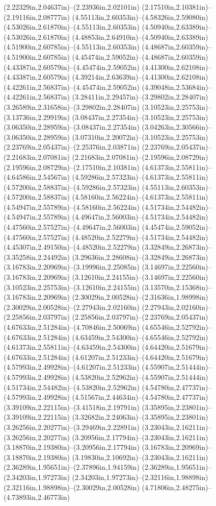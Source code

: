 (2.22329in,2.04637in)--(2.23936in,2.02101in) (2.17510in,2.10381in)--(2.19116in,2.08777in) (4.55113in,2.60353in)--(4.58326in,2.59080in) (4.53026in,2.61870in)--(4.55113in,2.60353in) (4.50940in,2.63389in)--(4.53026in,2.61870in) (4.48853in,2.64910in)--(4.50940in,2.63389in) (4.51900in,2.60785in)--(4.55113in,2.60353in) (4.48687in,2.60359in)--(4.51900in,2.60785in) (4.45474in,2.59052in)--(4.48687in,2.60359in) (4.43387in,2.60579in)--(4.45474in,2.59052in) (4.41300in,2.62108in)--(4.43387in,2.60579in) (4.39214in,2.63639in)--(4.41300in,2.62108in) (4.42261in,2.56837in)--(4.45474in,2.59052in) (4.39048in,2.53684in)--(4.42261in,2.56837in) (3.28411in,2.29457in)--(3.29802in,2.28407in) (3.26589in,2.31658in)--(3.29802in,2.28407in) (3.10523in,2.25753in)--(3.13736in,2.29919in) (3.08437in,2.27354in)--(3.10523in,2.25753in) (3.06350in,2.28959in)--(3.08437in,2.27354in) (3.04263in,2.30566in)--(3.06350in,2.28959in) (3.07310in,2.20072in)--(3.10523in,2.25753in) (2.23769in,2.05437in)--(2.25376in,2.03871in) (2.23769in,2.05437in)--(2.21683in,2.07081in) (2.21683in,2.07081in)--(2.19596in,2.08729in) (2.19596in,2.08729in)--(2.17510in,2.10381in) (4.61373in,2.55811in)--(4.64586in,2.54567in) (4.59286in,2.57323in)--(4.61373in,2.55811in) (4.57200in,2.58837in)--(4.59286in,2.57323in) (4.55113in,2.60353in)--(4.57200in,2.58837in) (4.58160in,2.56224in)--(4.61373in,2.55811in) (4.54947in,2.55789in)--(4.58160in,2.56224in) (4.51734in,2.54482in)--(4.54947in,2.55789in) (4.49647in,2.56003in)--(4.51734in,2.54482in) (4.47560in,2.57527in)--(4.49647in,2.56003in) (4.45474in,2.59052in)--(4.47560in,2.57527in) (4.48520in,2.52279in)--(4.51734in,2.54482in) (4.45307in,2.49150in)--(4.48520in,2.52279in) (3.32849in,2.26873in)--(3.35258in,2.24492in) (3.29636in,2.28608in)--(3.32849in,2.26873in) (3.16783in,2.20969in)--(3.19996in,2.25085in) (3.14697in,2.22560in)--(3.16783in,2.20969in) (3.12610in,2.24155in)--(3.14697in,2.22560in) (3.10523in,2.25753in)--(3.12610in,2.24155in) (3.13570in,2.15368in)--(3.16783in,2.20969in) (2.30029in,2.00528in)--(2.31636in,1.98998in) (2.30029in,2.00528in)--(2.27943in,2.02160in) (2.27943in,2.02160in)--(2.25856in,2.03797in) (2.25856in,2.03797in)--(2.23769in,2.05437in) (4.67633in,2.51284in)--(4.70846in,2.50069in) (4.65546in,2.52792in)--(4.67633in,2.51284in) (4.63459in,2.54300in)--(4.65546in,2.52792in) (4.61373in,2.55811in)--(4.63459in,2.54300in) (4.64420in,2.51679in)--(4.67633in,2.51284in) (4.61207in,2.51233in)--(4.64420in,2.51679in) (4.57993in,2.49928in)--(4.61207in,2.51233in) (4.55907in,2.51444in)--(4.57993in,2.49928in) (4.53820in,2.52962in)--(4.55907in,2.51444in) (4.51734in,2.54482in)--(4.53820in,2.52962in) (4.54780in,2.47737in)--(4.57993in,2.49928in) (4.51567in,2.44634in)--(4.54780in,2.47737in) (3.39109in,2.22115in)--(3.41518in,2.19791in) (3.35895in,2.23801in)--(3.39109in,2.22115in) (3.32682in,2.24063in)--(3.35895in,2.23801in) (3.26256in,2.20277in)--(3.29469in,2.22891in) (3.23043in,2.16211in)--(3.26256in,2.20277in) (3.20956in,2.17794in)--(3.23043in,2.16211in) (3.18870in,2.19380in)--(3.20956in,2.17794in) (3.16783in,2.20969in)--(3.18870in,2.19380in) (3.19830in,2.10692in)--(3.23043in,2.16211in) (2.36289in,1.95651in)--(2.37896in,1.94159in) (2.36289in,1.95651in)--(2.34203in,1.97273in) (2.34203in,1.97273in)--(2.32116in,1.98898in) (2.32116in,1.98898in)--(2.30029in,2.00528in) (4.71806in,2.48275in)--(4.73893in,2.46773in) 